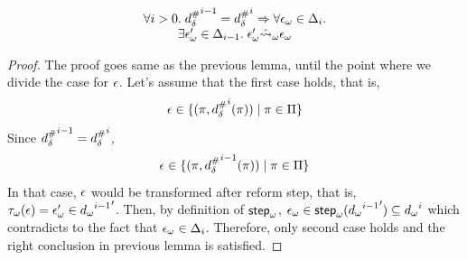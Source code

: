 \begin{corollary}\label{corollary:only-from-diffset}
  \[
    \begin{array}{c}
      \forall i > 0. \; {{d}^{\#}_\delta}^{i-1} = {{d}^{\#}_\delta}^i \Rightarrow
      \forall {\epsilon}_\omega \in \Delta_i. \\
      \exists {\epsilon}_\omega' \in \Delta_{i-1} . \; {\epsilon}_\omega' \hat{\leadsto}_\omega {\epsilon}_\omega
    \end{array}
  \]
\end{corollary}
\begin{proof}
  The proof goes same as the previous lemma, until the point where we divide
  the case for $\epsilon$. Let's assume that the first case holds, that is,
  \[
    \epsilon \in \{ (\pi, {{d}^{\#}_\delta}^i(\pi)) \mid \pi \in \Pi \}
  \]
  Since ${{d}^{\#}_\delta}^{i-1} = {{d}^{\#}_\delta}^i$,
  \[
    \epsilon \in \{ (\pi, {{d}^{\#}_\delta}^{i-1}(\pi)) \mid \pi \in \Pi \}
  \]
  In that case, $\epsilon$ would be transformed after reform step, that is,
  ${\tau}_\omega(\epsilon) = {\epsilon}_\omega' \in {{{d}_\omega}^{i-1}}'$.
  Then, by definition of ${\textsf{step}}_\omega$,
  ${\epsilon}_\omega \in {\textsf{step}}_\omega({{{d}_\omega}^{i-1}}') \subseteq {{d}_\omega}^i$
  which contradicts to the fact that ${\epsilon}_\omega \in \Delta_i$.
  Therefore, only second case holds and the right conclusion in previous lemma is satisfied.
\end{proof}

